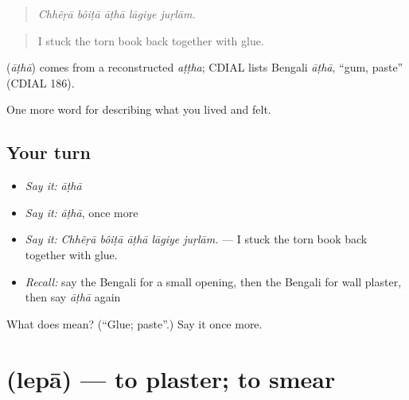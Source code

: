 \begin{quote}
    
\end{quote}

\begin{quote}
\emph{Chhẽṛā bôiṭā āṭhā lāgiye juṛlām.}
\end{quote}

\begin{quote}
I stuck the torn book back together with glue.
\end{quote}

\begin{cousinweb}
\textbf{} (\emph{āṭhā}) comes from a reconstructed \emph{aṭṭha}; CDIAL lists Bengali \emph{āṭhā}, \textquotedblleft{}gum, paste\textquotedblright{} (CDIAL 186).
\end{cousinweb}

\begin{grammarlens}[title={What you've built}]
One more word for describing what you lived and felt.
\end{grammarlens}

\subsection*{Your turn}
\begin{itemize}
\raggedright
  \item \emph{Say it:} \emph{āṭhā}
  \item \emph{Say it:} \emph{āṭhā}, once more
  \item \emph{Say it:} \emph{Chhẽṛā bôiṭā āṭhā lāgiye juṛlām.} — I stuck the torn book back together with glue.
  \item \emph{Recall:} say the Bengali for a small opening, then the Bengali for wall plaster, then say \emph{āṭhā} again
\end{itemize}

\begin{tcolorbox}[breakable,colback=teal!4,colframe=teal!35!black,title={Before you move on}]
What does  mean? (\textquotedblleft{}Glue; paste\textquotedblright{}.) Say it once more.
\end{tcolorbox}
\section[\texorpdfstring{\bn{লেপা} (lepā)}{লেপা (lepā)}]{ (lepā) — to plaster; to smear}

\label{lesson:BN-C507-lepa}



